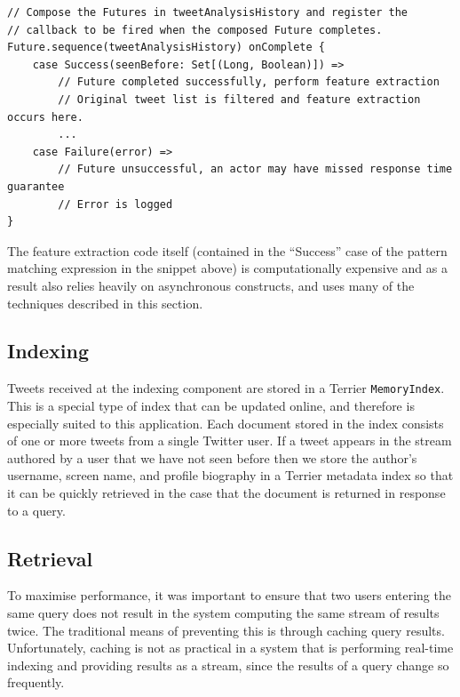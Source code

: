 \documentclass{l4proj}
\newcommand{\code}[1]{\texttt{#1}}
\begin{document}
\begin{lstlisting}[caption=Composing Futures unto a single future and registering the onComplete callback.]
// Compose the Futures in tweetAnalysisHistory and register the
// callback to be fired when the composed Future completes.
Future.sequence(tweetAnalysisHistory) onComplete {
    case Success(seenBefore: Set[(Long, Boolean)]) =>
        // Future completed successfully, perform feature extraction
        // Original tweet list is filtered and feature extraction occurs here.
        ...
    case Failure(error) =>
        // Future unsuccessful, an actor may have missed response time guarantee
        // Error is logged
}
\end{lstlisting}

The feature extraction code itself (contained in the ``Success'' case of the pattern matching expression in the snippet above) is computationally expensive and as a result also relies heavily on asynchronous constructs, and uses many of the techniques described in this section.

        \subsection{Indexing}
        Tweets received at the indexing component are stored in a Terrier \code{MemoryIndex}. This is a special type of index that can be updated  online, and therefore is especially suited to this application. Each document stored in the index consists of one or more tweets from a single Twitter user. If a tweet appears in the stream authored by a user that we have not seen before then we store the author's username, screen name, and profile biography in a Terrier metadata index so that it can be quickly retrieved in the case that the document is returned in response to a query.        
        
        \subsection{Retrieval}
        
        To maximise performance, it was important to ensure that two users entering the same query does not result in the system computing the same stream of results twice. The traditional means of preventing this is through caching query results. Unfortunately, caching is not as practical in a system that is performing real-time indexing and providing results as a stream, since the results of a query change so frequently.
        
\end{document}
